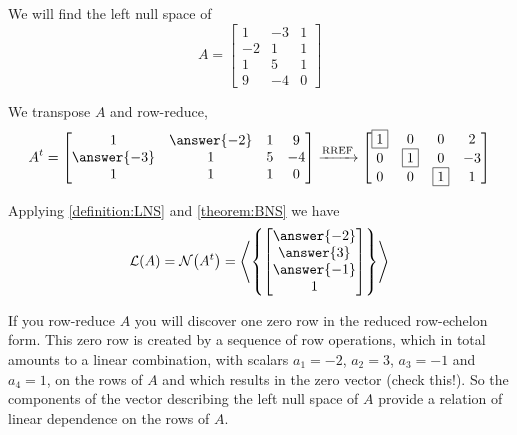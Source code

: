 \documentclass{ximera}
\begin{document}

\begin{example}

We will find the left null space of
\[
A=
\begin{bmatrix}
 1 & -3 & 1 \\
 -2 & 1 & 1 \\
 1 & 5 & 1 \\
 9 & -4 & 0
\end{bmatrix}
\]

We transpose $A$ and row-reduce,
\[
\transpose{A}=
\begin{bmatrix}
 1 & \answer{-2} & 1 & 9 \\
 \answer{-3} & 1 & 5 & -4 \\
 1 & 1 & 1 & 0
\end{bmatrix}
\rref
\begin{bmatrix}
 \leading{1} & 0 & 0 & 2 \\
 0 & \leading{1} & 0 & -3 \\
 0 & 0 & \leading{1} & 1
\end{bmatrix}
\]

Applying \ref{definition:LNS} and \ref{theorem:BNS} we have
\[
\lns{A}=\nsp{\transpose{A}}=
\spn{\set{
\colvector{\answer{-2}\\\answer{3}\\\answer{-1}\\1}
}}
\]

If you row-reduce $A$ you will discover one zero row in the reduced
row-echelon form.  This zero row is created by a sequence of row
operations, which in total amounts to a linear combination, with
scalars $a_1=-2$, $a_2=3$, $a_3=-1$ and $a_4=1$, on the rows of $A$
and which results in the zero vector (check this!).  So the components
of the vector describing the left null space of $A$ provide a relation
of linear dependence on the rows of $A$.

\end{example}
\end{document}
